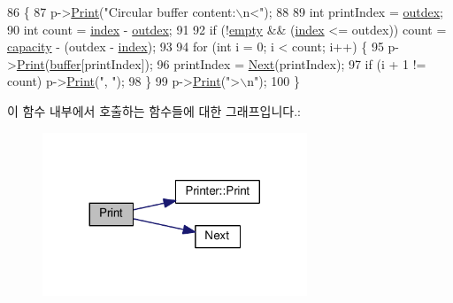\begin{DoxyCode}
86 \{
87     p->\hyperlink{class_printer_a994476278c184fc7a85d2cf025d45214}{Print}(\textcolor{stringliteral}{"Circular buffer content:\(\backslash\)n<"});
88 
89     \textcolor{keywordtype}{int} printIndex = \hyperlink{class_circular_buffer_a1dc0e18118d416f24b42621f06cda31d}{outdex};
90     \textcolor{keywordtype}{int} count = \hyperlink{class_circular_buffer_a750b5d744c39a06bfb13e6eb010e35d0}{index} - \hyperlink{class_circular_buffer_a1dc0e18118d416f24b42621f06cda31d}{outdex};
91 
92     \textcolor{keywordflow}{if} (!\hyperlink{class_circular_buffer_a9625b002313a3fef67010c74415e5911}{empty} && (\hyperlink{class_circular_buffer_a750b5d744c39a06bfb13e6eb010e35d0}{index} <= outdex)) count = \hyperlink{class_circular_buffer_adbe66a087ac3fd4a5b0566f64ca2d12b}{capacity} - (outdex - 
      \hyperlink{class_circular_buffer_a750b5d744c39a06bfb13e6eb010e35d0}{index});
93 
94     \textcolor{keywordflow}{for} (\textcolor{keywordtype}{int} i = 0; i < count; i++) \{
95         p->\hyperlink{class_printer_a994476278c184fc7a85d2cf025d45214}{Print}(\hyperlink{class_circular_buffer_a74c07922a00b8d07d761cfc6e03ae354}{buffer}[printIndex]);
96         printIndex = \hyperlink{class_circular_buffer_abe22b9abf6ac9ebb941acdcea9f5abbe}{Next}(printIndex);
97         \textcolor{keywordflow}{if} (i + 1 != count) p->\hyperlink{class_printer_a994476278c184fc7a85d2cf025d45214}{Print}(\textcolor{stringliteral}{", "});
98     \}
99     p->\hyperlink{class_printer_a994476278c184fc7a85d2cf025d45214}{Print}(\textcolor{stringliteral}{">\(\backslash\)n"});
100 \}
\end{DoxyCode}


이 함수 내부에서 호출하는 함수들에 대한 그래프입니다.\+:
\nopagebreak
\begin{figure}[H]
\begin{center}
\leavevmode
\includegraphics[width=224pt]{class_circular_buffer_a79915bb6ec9a5decf43547e4591ba04c_cgraph}
\end{center}
\end{figure}



